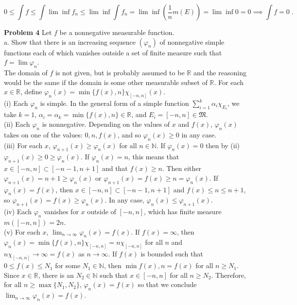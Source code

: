 \documentclass[a4paper]{article}
\begin{document}
$$0 \leq \int f \leq \int \lim \inf f_n \leq \lim \inf \int f_n = \lim \inf \left(\frac{1}{n} m(E)\right) = \lim \inf 0 = 0 \implies \int f = 0 \;.$$

{\bf Problem 4} Let $f$ be a nonnegative measurable function. \\

a. Show that there is an increasing sequence $(\varphi_n)$ of nonnegative simple functions each of which vanishes outside a set of finite measure such that $f = \lim \varphi_n$. \\

The domain of $f$ is not given, but is probably assumed to be $\mathbb{R}$ and the reasoning would be the same if the domain is some other measurable subset of $\mathbb{R}$. For each $x \in \mathbb{R}$, define $\varphi_n(x) = \min\{f(x), n\} \chi_{[-n,n]} (x)$. \\

(i) Each $\varphi_n$ is simple. In the general form of a simple function $\sum_{i=1}^k \alpha_i \chi_{E_i}$, we take $k = 1$, $\alpha_i = \alpha_k = \min \{f(x), n\} \in \mathbb{R}$, and $E_i = [-n,n] \in \mathfrak{M}$.\\

(ii) Each $\varphi_n$ is nonnegative. Depending on the values of $x$ and $f(x)$, $\varphi_n(x)$ takes on one of the values: $0, n, f(x)$, and so $\varphi_n(x) \geq 0$ in any case. \\

(iii) For each $x$, $\varphi_{n+1}(x) \geq \varphi_n(x)$ for all $n \in \mathbb{N}$. If $\varphi_n(x) = 0$ then by (ii) $\varphi_{n+1}(x) \geq 0 \geq \varphi_n(x)$. If $\varphi_{n}(x) = n$, this means that $x \in [-n,n]\subset [-n-1, n+1]$ and that $f(x) \geq n$. Then either $\varphi_{n+1}(x) = n+1 \geq \varphi_n(x)$ or $\varphi_{n+1}(x) = f(x) \geq n = \varphi_n(x)$. If $\varphi_n(x) = f(x)$, then $x \in [-n,n] \subset [-n-1, n+1]$ and $f(x) \leq n \leq n+1$, so $\varphi_{n+1}(x) = f(x) \geq \varphi_n(x)$. In any case, $\varphi_n(x) \leq \varphi_{n+1}(x)$. \\

(iv) Each $\varphi_n$ vanishes for $x$ outside of $[-n,n]$, which has finite measure $m([-n,n]) = 2n$. \\

(v) For each $x$, $\lim_{n\rightarrow \infty} \varphi_n (x) = f(x)$. If $f(x) = \infty$, then $\varphi_n(x) =\min \{f(x), n\}\chi_{[-n,n]} = n\chi_{[-n,n]}$ for all $n$ and $n\chi_{[-n,n]} \rightarrow \infty = f(x)$ as $n\rightarrow \infty$. If $f(x)$ is bounded such that $0 \leq f(x) \leq N_1$ for some $N_1 \in \mathbb{N}$, then $\min{f(x), n} = f(x)$ for all $n \geq N_1$. Since $x \in \mathbb{R}$, there is an $N_2 \in \mathbb{N}$ such that $x \in [-n,n]$ for all $n \geq N_2$. Therefore, for all $n \geq \max \{N_1,N_2\}$, $\varphi_n(x) = f(x)$ so that we conclude $\lim_{n\rightarrow \infty} \varphi_{n}(x) =f(x)$. \\
\end{document}
